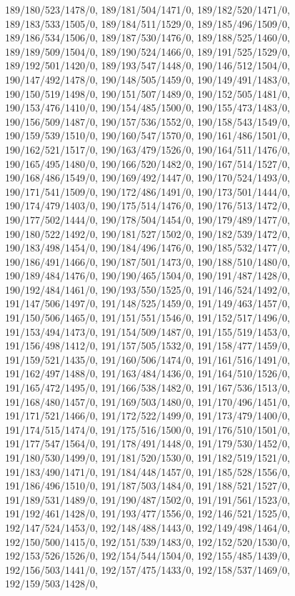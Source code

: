 {189/180/523/1478/0,%
189/181/504/1471/0,%
189/182/520/1471/0,%
189/183/533/1505/0,%
189/184/511/1529/0,%
189/185/496/1509/0,%
189/186/534/1506/0,%
189/187/530/1476/0,%
189/188/525/1460/0,%
189/189/509/1504/0,%
189/190/524/1466/0,%
189/191/525/1529/0,%
189/192/501/1420/0,%
189/193/547/1448/0,%
190/146/512/1504/0,%
190/147/492/1478/0,%
190/148/505/1459/0,%
190/149/491/1483/0,%
190/150/519/1498/0,%
190/151/507/1489/0,%
190/152/505/1481/0,%
190/153/476/1410/0,%
190/154/485/1500/0,%
190/155/473/1483/0,%
190/156/509/1487/0,%
190/157/536/1552/0,%
190/158/543/1549/0,%
190/159/539/1510/0,%
190/160/547/1570/0,%
190/161/486/1501/0,%
190/162/521/1517/0,%
190/163/479/1526/0,%
190/164/511/1476/0,%
190/165/495/1480/0,%
190/166/520/1482/0,%
190/167/514/1527/0,%
190/168/486/1549/0,%
190/169/492/1447/0,%
190/170/524/1493/0,%
190/171/541/1509/0,%
190/172/486/1491/0,%
190/173/501/1444/0,%
190/174/479/1403/0,%
190/175/514/1476/0,%
190/176/513/1472/0,%
190/177/502/1444/0,%
190/178/504/1454/0,%
190/179/489/1477/0,%
190/180/522/1492/0,%
190/181/527/1502/0,%
190/182/539/1472/0,%
190/183/498/1454/0,%
190/184/496/1476/0,%
190/185/532/1477/0,%
190/186/491/1466/0,%
190/187/501/1473/0,%
190/188/510/1480/0,%
190/189/484/1476/0,%
190/190/465/1504/0,%
190/191/487/1428/0,%
190/192/484/1461/0,%
190/193/550/1525/0,%
191/146/524/1492/0,%
191/147/506/1497/0,%
191/148/525/1459/0,%
191/149/463/1457/0,%
191/150/506/1465/0,%
191/151/551/1546/0,%
191/152/517/1496/0,%
191/153/494/1473/0,%
191/154/509/1487/0,%
191/155/519/1453/0,%
191/156/498/1412/0,%
191/157/505/1532/0,%
191/158/477/1459/0,%
191/159/521/1435/0,%
191/160/506/1474/0,%
191/161/516/1491/0,%
191/162/497/1488/0,%
191/163/484/1436/0,%
191/164/510/1526/0,%
191/165/472/1495/0,%
191/166/538/1482/0,%
191/167/536/1513/0,%
191/168/480/1457/0,%
191/169/503/1480/0,%
191/170/496/1451/0,%
191/171/521/1466/0,%
191/172/522/1499/0,%
191/173/479/1400/0,%
191/174/515/1474/0,%
191/175/516/1500/0,%
191/176/510/1501/0,%
191/177/547/1564/0,%
191/178/491/1448/0,%
191/179/530/1452/0,%
191/180/530/1499/0,%
191/181/520/1530/0,%
191/182/519/1521/0,%
191/183/490/1471/0,%
191/184/448/1457/0,%
191/185/528/1556/0,%
191/186/496/1510/0,%
191/187/503/1484/0,%
191/188/521/1527/0,%
191/189/531/1489/0,%
191/190/487/1502/0,%
191/191/561/1523/0,%
191/192/461/1428/0,%
191/193/477/1556/0,%
192/146/521/1525/0,%
192/147/524/1453/0,%
192/148/488/1443/0,%
192/149/498/1464/0,%
192/150/500/1415/0,%
192/151/539/1483/0,%
192/152/520/1530/0,%
192/153/526/1526/0,%
192/154/544/1504/0,%
192/155/485/1439/0,%
192/156/503/1441/0,%
192/157/475/1433/0,%
192/158/537/1469/0,%
192/159/503/1428/0,%
}

